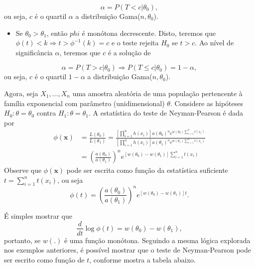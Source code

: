 \documentclass[
  letterpaper,
  DIV=11,
  numbers=noendperiod]{scrartcl}
\providecommand{\tightlist}{%
  \setlength{\itemsep}{0pt}\setlength{\parskip}{0pt}}\usepackage{longtable,booktabs,array}
\begin{document}
\[\alpha=P(T<c|\theta_0),\] ou seja, \(c\) é o quartil \(\alpha\) a
distribuição Gama(\(n,\theta_0\)).

\begin{itemize}
\tightlist
\item
  Se \(\theta_0>\theta_1\), então \(phi\) é monótona decrescente. Disto,
  teremos que \(\phi(t)<k\Rightarrow t >\phi^{-1}(k)=c\) e o teste
  rejeita \(H_0\) se \(t>c\). Ao nível de significância \(\alpha\),
  teremos que \(c\) é a solução de
\end{itemize}

\[\alpha=P(T>c|\theta_0)\Rightarrow P(T\leq c|\theta_0)=1-\alpha,\] ou
seja, \(c\) é o quartil \(1-\alpha\) a distribuição
Gama(\(n,\theta_0\)).

Agora, seja \(X_1,\ldots,X_n\) uma amostra aleatória de uma população
pertencente à família exponencial com parâmetro (unidimensional)
\(\theta\). Considere as hipóteses \(H_0:\theta=\theta_0\) contra
\(H_1:\theta=\theta_1\). A estatística do teste de Neyman-Pearson é dada
por
\[\begin{align}\phi(\textbf{x})&=\frac{L(\theta_0)}{L(\theta_1)}=\frac{\left[\prod_{i=1}^n h(x_i)\right]a(\theta_0)^ne^{w(\theta_0)\sum_{i=1}^n t(x_i)}}{\left[\prod_{i=1}^n h(x_i)\right]a(\theta_1)^ne^{w(\theta_1)\sum_{i=1}^n t(x_i)}}\\&=\left(\frac{a(\theta_0)}{a(\theta_1)}\right)^ne^{[w(\theta_0)-w(\theta_1)]\sum_{i=1}^n t(x_i)}\end{align}\]
Observe que \(\phi(\textbf{x})\) pode ser escrita como função da
estatística suficiente \(t=\sum_{i=1}^n t(x_i)\), ou seja
\[\phi(t)=\left(\frac{a(\theta_0)}{a(\theta_1)}\right)^ne^{[w(\theta_0)-w(\theta_1)]t}.\]

É simples mostrar que
\[\frac{d}{dt}\log \phi(t)=w(\theta_0)-w(\theta_1),\] portanto, se
\(w(.)\) é uma função monótona. Seguindo a mesma lógica explorada nos
exemplos anteriores, é possível mostrar que o teste de Neyman-Pearson
pode ser escrito como função de \(t\), conforme mostra a tabela abaixo.
\end{document}
